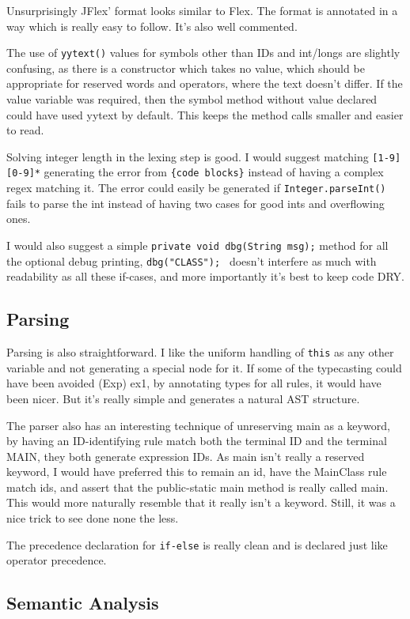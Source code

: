 \documentclass[a4paper,11pt]{article}
\begin{document}
Unsurprisingly JFlex' format looks similar to Flex. The format is annotated in
a way which is really easy to follow. It's also well commented.

The use of {\tt yytext()} values for symbols other than IDs and int/longs are
slightly confusing, as there is a constructor which takes no value, which
should be appropriate for reserved words and operators, where the text doesn't
differ. If the value variable was required, then the symbol method without
value declared could have used yytext by default. This keeps the method calls
smaller and easier to read.

Solving integer length in the lexing step is good. I would suggest matching
{\tt [1-9][0-9]*} generating the error from {\tt \{code blocks\}} instead of
having a complex regex matching it. The error could easily be generated if
{\tt Integer.parseInt()} fails to parse the int instead of having two cases for
good ints and overflowing ones.

I would also suggest a simple {\tt private void dbg(String msg);} method for
all the optional debug printing, {\tt dbg("CLASS"); } doesn't interfere as much
with readability as all these if-cases, and more importantly it's best to keep
code DRY.

\subsection*{Parsing}

Parsing is also straightforward. I like the uniform handling of {\tt this} as
any other variable and not generating a special node for it. If some of the
typecasting could have been avoided (Exp) ex1, by annotating types for all
rules, it would have been nicer. But it's really simple and generates a natural
AST structure.

The parser also has an interesting technique of unreserving main as a keyword,
by having an ID-identifying rule match both the terminal ID and the terminal
MAIN, they both generate expression IDs. As main isn't really a reserved
keyword, I would have preferred this to remain an id, have the MainClass rule
match ids, and assert that the public-static main method is really called main.
This would more naturally resemble that it really isn't a keyword. Still, it
was a nice trick to see done none the less.

The precedence declaration for {\tt if-else} is really clean and is declared
just like operator precedence.

\subsection*{Semantic Analysis}
\end{document}
